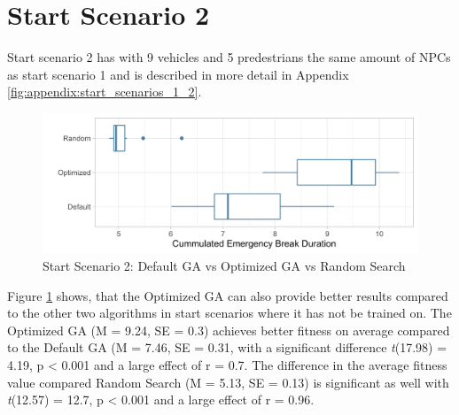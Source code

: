 \section{Start Scenario 2}
Start scenario 2 has with 9 vehicles and 5 predestrians the same amount of NPCs as start scenario 1 and is described in more detail in Appendix \ref{fig:appendix:start_scenarios_1_2}.

\begin{figure}[ht] 
	\label{fig:evaluation:sim_2_comparison}
	\includegraphics[width=1\linewidth]{simulations/evaluation/plots/sim_2_comparison}
	\caption{Start Scenario 2: Default GA vs Optimized GA vs Random Search}
\end{figure}

Figure \ref{fig:evaluation:sim_2_comparison} shows, that the Optimized GA can also provide better results compared to the other two algorithms in start scenarios where it has not be trained on. The Optimized GA (M = 9.24, SE = 0.3) achieves better fitness on average compared to the Default GA (M = 7.46, SE = 0.31, with a significant difference \textit{t}(17.98) = 4.19, p < 0.001 and a large effect of r = 0.7. The difference in the average fitness value compared Random Search (M = 5.13, SE = 0.13) is significant as well with \textit{t}(12.57) = 12.7, p < 0.001 and a large effect of r = 0.96.

